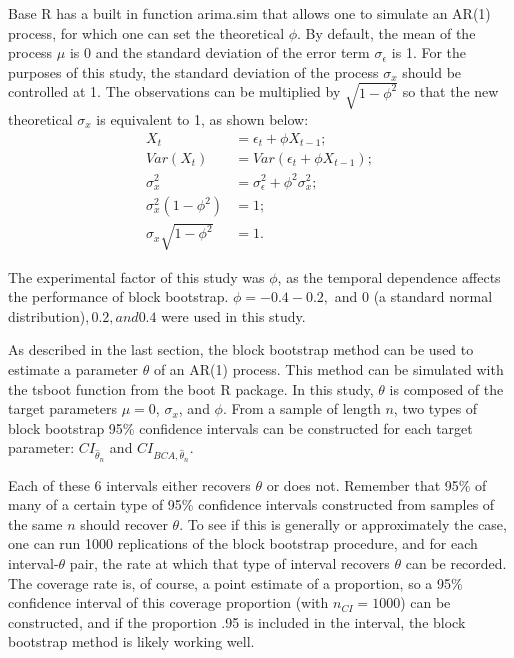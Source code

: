 \documentclass[12pt, letterpaper, titlepage]{article}
\begin{document}



Base R has a built in function arima.sim that allows one to simulate an AR(1) process, for which one can set the theoretical $\phi$. 
By default, the mean of the process $\mu$ is 0 and the standard deviation of the error term $\sigma_{\epsilon}$ is 1. 
For the purposes of this study, the standard deviation of the process $\sigma_{x}$ should be controlled at 1. 
The observations can be multiplied by $\sqrt{1 - \phi^2}$ so that the new theoretical $\sigma_{x}$ is equivalent to 1, as shown below:
\begin{align}
X_{t} &= \epsilon_{t} + \phi X_{t-1};\\
Var(X_{t}) &= Var(\epsilon_{t} + \phi X_{t-1});\\
\sigma^2_{x} &= \sigma^2_{\epsilon} + \phi^2 \sigma^2_{x};\\
\sigma^2_{x}(1 - \phi^2) &= 1;\\
\sigma_{x}\sqrt{1 - \phi^2} &= 1.
\end{align}

The experimental factor of this study was $\phi$, as the temporal dependence affects the performance of block bootstrap. 
$\phi = -0.4 -0.2,$ and $0$ (a standard normal distribution)$, 0.2, and 0.4$ were used in this study. 


As described in the last section, the block bootstrap method can be used to estimate a parameter $\theta$ of an AR(1) process. 
This method can be simulated with the tsboot function from the boot R package. In this study, $\theta$ is composed of the target 
parameters $\mu = 0$, $\sigma_{x}$, and $\phi$. From a sample of length $n$, two types of block bootstrap 95\% confidence intervals 
can be constructed for each target parameter: $CI_{\hat{\theta}_{n}}$ and $CI_{BCA, \hat{\theta}_{n}}$.


Each of these 6 intervals either recovers $\theta$ or does not. Remember that 95\% of many of a certain type of 95\% confidence intervals 
constructed from samples of the same $n$ should recover $\theta$. To see if this is generally or approximately the case, one can run 
1000 replications of the block bootstrap procedure, and for each interval-$\theta$ pair, the rate at which that type of interval recovers 
$\theta$ can be recorded. The coverage rate is, of course, a point estimate of a proportion, so a 95\% confidence interval of this coverage proportion 
(with $n_{CI} = 1000$) can be constructed, and if the proportion .95 is included in the interval, the block bootstrap method is likely working well.
\end{document}
